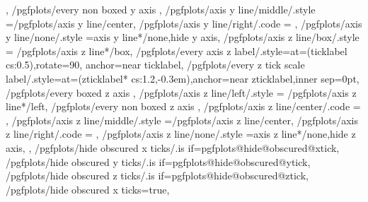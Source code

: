 {{{{{					\fi
				},%
				/pgfplots/every non boxed y axis}%
		},
		/pgfplots/axis y line/middle/.style	={/pgfplots/axis y line/center},
		/pgfplots/axis y line/right/.code	={%
			\ifnum{}
			\fi
		},%
		/pgfplots/axis y line/none/.style	={axis y line*/none,hide y axis},
		/pgfplots/axis z line/box/.style	={
			/pgfplots/axis z line*/box,
			/pgfplots/every axis z label/.style={at={(ticklabel cs:0.5)},rotate=90, anchor=near ticklabel},
			/pgfplots/every z tick scale label/.style={at={(zticklabel* cs:1.2,-0.3em)},anchor=near zticklabel,inner sep=0pt},
			/pgfplots/every boxed z axis
		},
		/pgfplots/axis z line/left/.style	={
			/pgfplots/axis z line*/left,
			/pgfplots/every non boxed z axis
		},
		/pgfplots/axis z line/center/.code	={
		},
		/pgfplots/axis z line/middle/.style	={/pgfplots/axis z line/center},
		/pgfplots/axis z line/right/.code	={%
			\ifnum{}
			\fi
		},%
		/pgfplots/axis z line/none/.style	={axis z line*/none,hide z axis},
	},
	/pgfplots/hide obscured x ticks/.is if=pgfplots@hide@obscured@xtick,
	/pgfplots/hide obscured y ticks/.is if=pgfplots@hide@obscured@ytick,
	/pgfplots/hide obscured z ticks/.is if=pgfplots@hide@obscured@ztick,
	/pgfplots/hide obscured x ticks=true,
}
